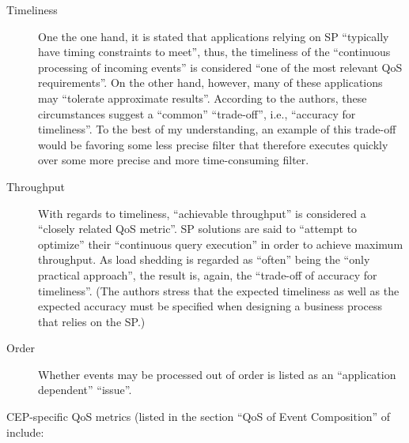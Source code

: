 \documentclass[article, type=bsc, colorback, accentcolor=tud8b, parskip=half, bibliography=totocnumbered]{tudthesis}
\begin{document}
\begin{description}

\item[Timeliness]
One the one hand, it is stated that applications relying on SP ``typically have timing constraints to meet'', thus, the timeliness of the ``continuous processing of incoming events'' is considered ``one of the most relevant QoS requirements''.
On the other hand, however, many of these applications may ``tolerate approximate results''.
According to the authors, these circumstances suggest a ``common'' ``trade-off'', i.e., ``accuracy for timeliness''.
To the best of my understanding, an example of this trade-off would be favoring some less precise filter that therefore executes quickly over some more precise and more time-consuming filter.

\item[Throughput]
With regards to timeliness, ``achievable throughput'' is considered a ``closely related QoS metric''.
SP solutions are said to ``attempt to optimize'' their ``continuous query execution'' in order to achieve maximum throughput.
As load shedding is regarded as ``often'' being the ``only practical approach'', the result is, again, the ``trade-off of accuracy for timeliness''.
(The authors stress that the expected timeliness as well as the expected accuracy must be specified when designing a business process that relies on the SP.)

\item[Order]
Whether events may be processed out of order is listed as an ``application dependent'' ``issue''.

\end{description}

CEP-specific QoS metrics (listed in the section ``QoS of Event Composition'' of \cite{Buchmann:2012:CEA:2413516.2413519} include:
\end{document}
